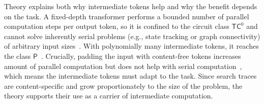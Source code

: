 Theory explains both why intermediate tokens help and why the benefit depends on the task.
A fixed-depth transformer performs a bounded number of parallel computation steps per output token, so it is confined to the circuit class $\mathsf{TC}^0$ and cannot solve inherently serial problems (e.g., state tracking or graph connectivity) of arbitrary input sizes~\citep{hahnTheoreticalLimitationsSelfAttention2020,merrillParallelismTradeoff2023,stroblWhatFormalLanguages2024}.
With polynomially many intermediate tokens, it reaches the class $\mathsf{P}$~\citep{merrillExpressivePowerTransformers2024}.
Crucially, padding the input with content-free tokens increases amount of parallel computation but does not help with serial computation~\citep{merrillExactExpressivePower2025,londonPauseExpressivity2025,pfauLetsThinkDot2024}, which means the intermediate tokens must adapt to the task.
Since search traces are content-specific and grow proportionately to the size of the problem, the theory supports their use as a carrier of intermediate computation.

